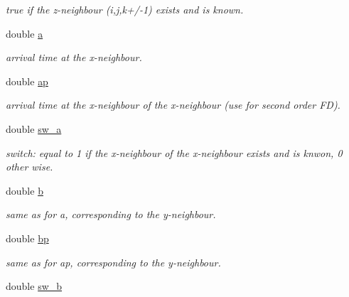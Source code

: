 \begin{DoxyCompactItemize}
\begin{DoxyCompactList}\small\item\em true if the z-\/neighbour (i,j,k+/-\/1) exists and is known. \end{DoxyCompactList}\item 
\hypertarget{class_tetra_a7a7b26176c3f9eda4c27589fa8338fe0}{}double \hyperlink{class_tetra_a7a7b26176c3f9eda4c27589fa8338fe0}{a}\label{class_tetra_a7a7b26176c3f9eda4c27589fa8338fe0}

\begin{DoxyCompactList}\small\item\em arrival time at the x-\/neighbour. \end{DoxyCompactList}\item 
\hypertarget{class_tetra_ae624a956b1416b954d49ec18fc056bae}{}double \hyperlink{class_tetra_ae624a956b1416b954d49ec18fc056bae}{ap}\label{class_tetra_ae624a956b1416b954d49ec18fc056bae}

\begin{DoxyCompactList}\small\item\em arrival time at the x-\/neighbour of the x-\/neighbour (use for second order F\+D). \end{DoxyCompactList}\item 
\hypertarget{class_tetra_ad0b4230d979c99f05f2a74e77e49535a}{}double \hyperlink{class_tetra_ad0b4230d979c99f05f2a74e77e49535a}{sw\+\_\+a}\label{class_tetra_ad0b4230d979c99f05f2a74e77e49535a}

\begin{DoxyCompactList}\small\item\em switch\+: equal to 1 if the x-\/neighbour of the x-\/neighbour exists and is knwon, 0 other wise. \end{DoxyCompactList}\item 
\hypertarget{class_tetra_a318e0f49f36b68b5d64c71ed63e6e4b6}{}double \hyperlink{class_tetra_a318e0f49f36b68b5d64c71ed63e6e4b6}{b}\label{class_tetra_a318e0f49f36b68b5d64c71ed63e6e4b6}

\begin{DoxyCompactList}\small\item\em same as for a, corresponding to the y-\/neighbour. \end{DoxyCompactList}\item 
\hypertarget{class_tetra_a8121994fb8d2879075f8492ac9407340}{}double \hyperlink{class_tetra_a8121994fb8d2879075f8492ac9407340}{bp}\label{class_tetra_a8121994fb8d2879075f8492ac9407340}

\begin{DoxyCompactList}\small\item\em same as for ap, corresponding to the y-\/neighbour. \end{DoxyCompactList}\item 
\hypertarget{class_tetra_a61138c5ced7462b978c344d01585a996}{}double \hyperlink{class_tetra_a61138c5ced7462b978c344d01585a996}{sw\+\_\+b}\label{class_tetra_a61138c5ced7462b978c344d01585a996}


\end{DoxyCompactItemize}
